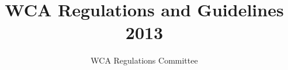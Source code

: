 
\usepackage[top=2cm, bottom=2cm, left=2cm, right=2cm]{geometry}

\usepackage[bookmarksopen=true]{hyperref}

\usepackage{bookmark}

\usepackage{fancyhdr}
\pagestyle{fancy}

\setcounter{secnumdepth}{-1}

\title{WCA Regulations and Guidelines 2013}
\author{WCA Regulations Committee}
\date{\vspace{-1em}}



\maketitle

